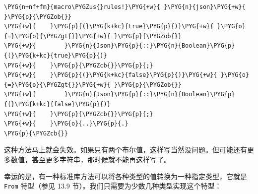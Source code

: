 \begin{Verbatim}[commandchars=\\\{\},breaklines=true,breakanywhere=true,fontsize=\codefont,xleftmargin=17bp]
\PYG{n+nf+fm}{macro\PYGZus{}rules!}\PYG{+w}{ }\PYG{n}{json}\PYG{+w}{ }\PYG{p}{\PYGZob{}}
\PYG{+w}{    }\PYG{p}{(}\PYG{k+kc}{true}\PYG{p}{)}\PYG{+w}{ }\PYG{o}{=}\PYG{o}{\PYGZgt{}}\PYG{+w}{ }\PYG{p}{\PYGZob{}}
\PYG{+w}{        }\PYG{n}{Json}\PYG{p}{::}\PYG{n}{Boolean}\PYG{p}{(}\PYG{k+kc}{true}\PYG{p}{)}
\PYG{+w}{    }\PYG{p}{\PYGZcb{}}\PYG{p}{;}
\PYG{+w}{    }\PYG{p}{(}\PYG{k+kc}{false}\PYG{p}{)}\PYG{+w}{ }\PYG{o}{=}\PYG{o}{\PYGZgt{}}\PYG{+w}{ }\PYG{p}{\PYGZob{}}
\PYG{+w}{        }\PYG{n}{Json}\PYG{p}{::}\PYG{n}{Boolean}\PYG{p}{(}\PYG{k+kc}{false}\PYG{p}{)}
\PYG{+w}{    }\PYG{p}{\PYGZcb{}}\PYG{p}{;}
\PYG{+w}{    }\PYG{o}{..}\PYG{p}{.}
\PYG{p}{\PYGZcb{}}
\end{Verbatim}

这种方法马上就会失效。如果只有两个布尔值，这样写当然没问题。但可能还有更多数值，甚至更多字符串，那时候就不能再这样写了。

幸运的是，有一种标准库方法可以将各种类型的值转换为一种指定类型，它就是 \texttt{From} 特型（参见 13.9 节）。我们只需要为少数几种类型实现这个特型：

